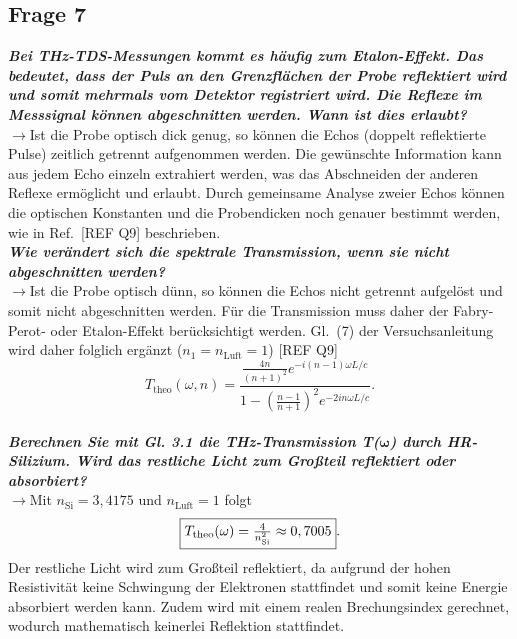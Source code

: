 \subsection{\label{subsec:FZV7}Frage 7}
\textbf{\textit{Bei THz-TDS-Messungen kommt es häufig zum Etalon-Effekt. Das bedeutet, dass
der Puls an den Grenzflächen der Probe reflektiert wird und somit mehrmals vom
Detektor registriert wird. Die Reflexe im Messsignal können abgeschnitten werden.
Wann ist dies erlaubt?}}\\
$\rightarrow$Ist die Probe optisch dick genug, so können die Echos (doppelt reflektierte Pulse) 
zeitlich getrennt aufgenommen werden. 
Die gewünschte Information kann aus jedem Echo einzeln extrahiert werden, was das Abschneiden 
der anderen Reflexe ermöglicht und erlaubt. Durch gemeinsame Analyse zweier Echos können 
die optischen Konstanten und die Probendicken noch genauer bestimmt werden, wie in 
Ref.~[REF Q9] beschrieben.\\

\textbf{\textit{Wie verändert sich die spektrale Transmission, wenn sie
nicht abgeschnitten werden?}}\\
$\rightarrow$Ist die Probe optisch dünn, so können die Echos nicht getrennt aufgelöst und somit 
nicht abgeschnitten werden. Für die Transmission muss daher der Fabry-Perot- oder Etalon-Effekt
berücksichtigt werden. Gl.~(7) der Versuchsanleitung wird daher folglich ergänzt 
($n_{1}=n_{\text{Luft}}=1$) [REF Q9]
\begin{equation}
    T_{\text{theo}}(\omega, n) = \frac{\frac{4n}{(n+1)^{2}}e^{-i(n-1)\omega L/c}}{1-\left(\frac{n-1}{n+1}\right)^{2}e^{-2in\omega L/c}}. 
\end{equation} \\

\textbf{\textit{Berechnen Sie mit Gl. 3.1 die THz-Transmission T($\mathbf{\omega}$) durch HR-Silizium. Wird
das restliche Licht zum Großteil reflektiert oder absorbiert?}}\\
$\rightarrow$Mit $n_{\text{Si}}=3,4175$ und $n_{\text{Luft}}=1$ folgt
\begin{equation}
    \fbox{$T_{\text{theo}}(\omega) = \frac{4}{n_{\text{Si}}^{2}} \approx 0,7005$}.
\end{equation}
Der restliche Licht wird zum Großteil reflektiert, da aufgrund der hohen Resistivität keine 
Schwingung der Elektronen stattfindet und somit keine Energie absorbiert werden kann. 
Zudem wird mit einem realen Brechungsindex gerechnet, wodurch mathematisch 
keinerlei Reflektion stattfindet. 
